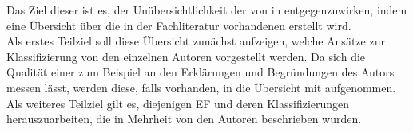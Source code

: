 Das Ziel dieser \BA ist es, der Unübersichtlichkeit der \KAS von \EF in 
\ISPS entgegenzuwirken, indem eine Übersicht über die in der Fachliteratur vorhandenen \KAS erstellt wird.\\
Als erstes Teilziel soll diese Übersicht zunächst aufzeigen, welche Ansätze zur Klassifizierung von den einzelnen Autoren vorgestellt werden.
Da sich die Qualität einer \KA zum Beispiel an den Erklärungen und Begründungen des Autors messen lässt, werden diese, falls vorhanden, in die
Übersicht mit aufgenommen.
Als weiteres Teilziel gilt es, diejenigen EF und deren Klassifizierungen herauszuarbeiten, die in Mehrheit von den Autoren beschrieben wurden.